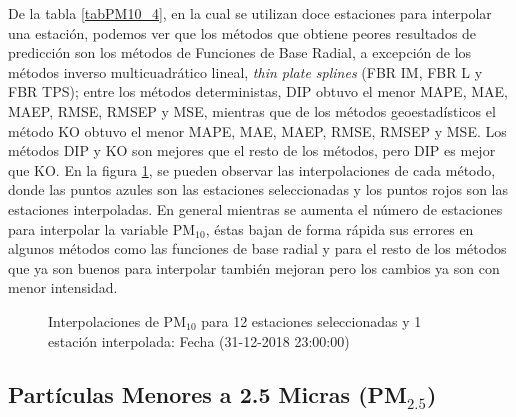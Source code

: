 De la tabla \ref{tabPM10_4}, en la cual se utilizan doce estaciones para interpolar una estación, podemos ver que los métodos que obtiene peores resultados de predicción son los métodos de Funciones de Base Radial, a excepción de los métodos inverso multicuadrático lineal, {\em thin plate splines} (FBR IM, FBR L y FBR TPS); entre los métodos deterministas, DIP obtuvo el menor MAPE, MAE, MAEP, RMSE, RMSEP y MSE, mientras que de los métodos geoestadísticos el método KO obtuvo el menor MAPE, MAE, MAEP, RMSE, RMSEP y MSE. Los métodos DIP y KO son mejores que el resto de los métodos, pero DIP es mejor que KO. En la figura \ref{PM10figure4}, se pueden observar las interpolaciones de cada método, donde las puntos azules son las estaciones seleccionadas y los puntos rojos son las estaciones interpoladas. En general mientras se aumenta el número de estaciones para interpolar la variable PM$_{10}$, éstas bajan de forma rápida sus errores en algunos métodos como las funciones de base radial y para el resto de los métodos que ya son buenos para interpolar también mejoran pero los cambios ya son con menor intensidad.

\begin{figure}[H]
\centering
{}
\subfigure[KO] {\texttt{[image: ./ok\_12\_5\_26302]}}
\subfigure[KU] {\texttt{[image: ./uk\_12\_5\_26302]}}
\caption{Interpolaciones de PM$_{10}$ para 12 estaciones seleccionadas y 1 estación interpolada: Fecha (31-12-2018 23:00:00)}
\label{PM10figure4}
\end{figure}





\subsection{Partículas Menores a 2.5 Micras (PM$_{2.5}$)}


